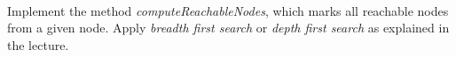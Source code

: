  \\
Implement the method  \emph{computeReachableNodes}, which marks all reachable 
nodes from a given node. Apply  \emph{breadth first search} or \emph{depth 
first search} as explained in the lecture.